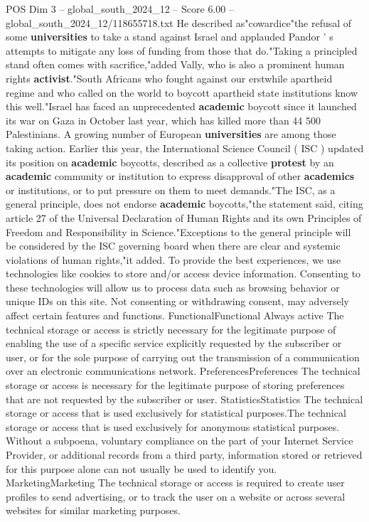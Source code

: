 \begin{textsample}{POS Dim 3 – global\_south\_2024\_12 – Score 6.00 – global\_south\_2024\_12/118655718.txt}
He described as"cowardice"the refusal of some \textbf{universities} to take a stand against Israel and applauded Pandor ' s attempts to mitigate any loss of funding from those that do."Taking a principled stand often comes with sacrifice,"added Vally, who is also a prominent human rights \textbf{activist}."South Africans who fought against our erstwhile apartheid regime and who called on the world to boycott apartheid state institutions know this well."Israel has faced an unprecedented \textbf{academic} boycott since it launched its war on Gaza in October last year, which has killed more than 44 500 Palestinians.
A growing number of European \textbf{universities} are among those taking action.
Earlier this year, the International Science Council ( ISC ) updated its position on \textbf{academic} boycotts, described as a collective \textbf{protest} by an \textbf{academic} community or institution to express disapproval of other \textbf{academics} or institutions, or to put pressure on them to meet demands."The ISC, as a general principle, does not endorse \textbf{academic} boycotts,"the statement said, citing article 27 of the Universal Declaration of Human Rights and its own Principles of Freedom and Responsibility in Science."Exceptions to the general principle will be considered by the ISC governing board when there are clear and systemic violations of human rights,"it added.
To provide the best experiences, we use technologies like cookies to store and/or access device information.
Consenting to these technologies will allow us to process data such as browsing behavior or unique IDs on this site.
Not consenting or withdrawing consent, may adversely affect certain features and functions.
FunctionalFunctional Always active The technical storage or access is strictly necessary for the legitimate purpose of enabling the use of a specific service explicitly requested by the subscriber or user, or for the sole purpose of carrying out the transmission of a communication over an electronic communications network.
PreferencesPreferences The technical storage or access is necessary for the legitimate purpose of storing preferences that are not requested by the subscriber or user.
StatisticsStatistics The technical storage or access that is used exclusively for statistical purposes.The technical storage or access that is used exclusively for anonymous statistical purposes.
Without a subpoena, voluntary compliance on the part of your Internet Service Provider, or additional records from a third party, information stored or retrieved for this purpose alone can not usually be used to identify you.
MarketingMarketing The technical storage or access is required to create user profiles to send advertising, or to track the user on a website or across several websites for similar marketing purposes.

\end{textsample}
